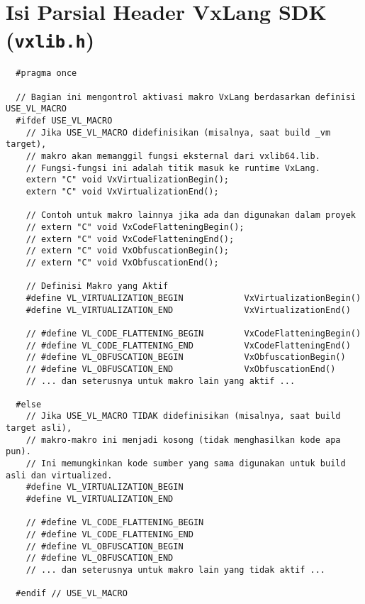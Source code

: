 \chapter*{Isi Parsial Header VxLang SDK (\texttt{vxlib.h})}
\label{app:vxlib_h_content_full} %

\begin{verbatim}
  #pragma once

  // Bagian ini mengontrol aktivasi makro VxLang berdasarkan definisi USE_VL_MACRO
  #ifdef USE_VL_MACRO
    // Jika USE_VL_MACRO didefinisikan (misalnya, saat build _vm target),
    // makro akan memanggil fungsi eksternal dari vxlib64.lib.
    // Fungsi-fungsi ini adalah titik masuk ke runtime VxLang.
    extern "C" void VxVirtualizationBegin();
    extern "C" void VxVirtualizationEnd();

    // Contoh untuk makro lainnya jika ada dan digunakan dalam proyek
    // extern "C" void VxCodeFlatteningBegin();
    // extern "C" void VxCodeFlatteningEnd();
    // extern "C" void VxObfuscationBegin();
    // extern "C" void VxObfuscationEnd();

    // Definisi Makro yang Aktif
    #define VL_VIRTUALIZATION_BEGIN            VxVirtualizationBegin()
    #define VL_VIRTUALIZATION_END              VxVirtualizationEnd()

    // #define VL_CODE_FLATTENING_BEGIN        VxCodeFlatteningBegin()
    // #define VL_CODE_FLATTENING_END          VxCodeFlatteningEnd()
    // #define VL_OBFUSCATION_BEGIN            VxObfuscationBegin()
    // #define VL_OBFUSCATION_END              VxObfuscationEnd()
    // ... dan seterusnya untuk makro lain yang aktif ...

  #else
    // Jika USE_VL_MACRO TIDAK didefinisikan (misalnya, saat build target asli),
    // makro-makro ini menjadi kosong (tidak menghasilkan kode apa pun).
    // Ini memungkinkan kode sumber yang sama digunakan untuk build asli dan virtualized.
    #define VL_VIRTUALIZATION_BEGIN
    #define VL_VIRTUALIZATION_END

    // #define VL_CODE_FLATTENING_BEGIN
    // #define VL_CODE_FLATTENING_END
    // #define VL_OBFUSCATION_BEGIN
    // #define VL_OBFUSCATION_END
    // ... dan seterusnya untuk makro lain yang tidak aktif ...

  #endif // USE_VL_MACRO

\end{verbatim}
\label{lst:vxlib_h_content_appendix_full}
